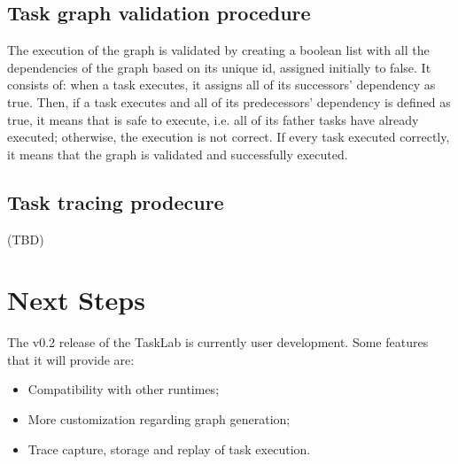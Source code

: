 \subsection{Task graph validation procedure}
The execution of the graph is validated by creating a boolean list with all the dependencies of the graph based on its unique id, assigned initially to false. It consists of: when a task executes, it assigns all of its successors' dependency as true. Then, if a task executes and all of its predecessors' dependency is defined as true, it means that is safe to execute, i.e. all of its father tasks have already executed; otherwise, the execution is not correct. If every task executed correctly, it means that the graph is validated and successfully executed.

\subsection{Task tracing prodecure}
(TBD)

\section{Next Steps}
The v0.2 release of the TaskLab is currently user development. Some features that it will provide are:
 \begin{itemize}
\item Compatibility with other runtimes;
\item More customization regarding graph generation;
\item Trace capture, storage and replay of task execution. 
\end{itemize}

 



